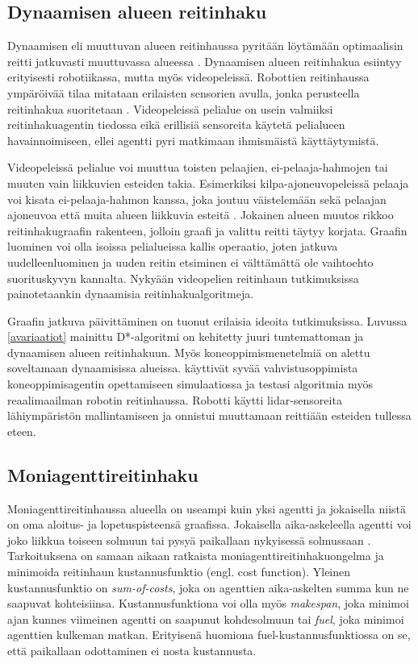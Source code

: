 \documentclass[utf8]{gradu3}
\begin{document}
\subsection{Dynaamisen alueen reitinhaku}

Dynaamisen eli muuttuvan alueen reitinhaussa pyritään löytämään optimaalisin reitti jatkuvasti muuttuvassa alueessa \parencite{lawande2022systematic}. Dynaamisen alueen reitinhakua esiintyy erityisesti robotiikassa, mutta myös videopeleissä. Robottien reitinhaussa ympäröivää tilaa mitataan erilaisten sensorien avulla, jonka perusteella reitinhakua suoritetaan \parencite{rahmani2022towards}. Videopeleissä pelialue on usein valmiiksi reitinhakuagentin tiedossa eikä erillisiä sensoreita käytetä pelialueen havainnoimiseen, ellei agentti pyri matkimaan ihmismäistä käyttäytymistä.

Videopeleissä pelialue voi muuttua toisten pelaajien, ei-pelaaja-hahmojen tai muuten vain liikkuvien esteiden takia. Esimerkiksi kilpa-ajoneuvopeleissä pelaaja voi kisata ei-pelaaja-hahmon kanssa, joka joutuu väistelemään sekä pelaajan ajoneuvoa että muita alueen liikkuvia esteitä \parencite{sazaki2017pathfinding}. Jokainen alueen muutos rikkoo reitinhakugraafin rakenteen, jolloin graafi ja valittu reitti täytyy korjata. Graafin luominen voi olla isoissa pelialueissa kallis operaatio, joten jatkuva uudelleenluominen ja uuden reitin etsiminen ei välttämättä ole vaihtoehto suorituskyvyn kannalta. Nykyään videopelien reitinhaun tutkimuksissa painotetaankin dynaamisia reitinhakualgoritmeja.

Graafin jatkuva päivittäminen on tuonut erilaisia ideoita tutkimuksissa. Luvussa \ref{avariaatiot} mainittu D*-algoritmi on kehitetty juuri tuntemattoman ja dynaamisen alueen reitinhakuun. Myös koneoppimismenetelmiä on alettu soveltamaan dynaamisissa alueissa. \textcite{lei2018dynamic} käyttivät syvää vahvistusoppimista koneoppimisagentin opettamiseen simulaatiossa ja testasi algoritmia myös reaalimaailman robotin reitinhaussa. Robotti käytti lidar-sensoreita lähiympäristön mallintamiseen ja onnistui muuttamaan reittiään esteiden tullessa eteen.

\subsection{Moniagenttireitinhaku}

Moniagenttireitinhaussa alueella on useampi kuin yksi agentti ja jokaisella niistä on oma aloitus- ja lopetuspisteensä graafissa. Jokaisella aika-askeleella agentti voi joko liikkua toiseen solmuun tai pysyä paikallaan nykyisessä solmussaan \parencite{sharon2015conflict,stern2019multi}. Tarkoituksena on samaan aikaan ratkaista moniagenttireitinhakuongelma ja minimoida reitinhaun kustannusfunktio (engl. cost function). Yleinen kustannusfunktio on \textit{sum-of-costs}, joka on agenttien aika-askelten summa kun ne saapuvat kohteisiinsa. Kustannusfunktiona voi olla myös \textit{makespan}, joka minimoi ajan kunnes viimeinen agentti on saapunut kohdesolmuun tai \textit{fuel}, joka minimoi agenttien kulkeman matkan. Erityisenä huomiona fuel-kustannusfunktiossa on se, että paikallaan odottaminen ei nosta kustannusta.
\end{document}
